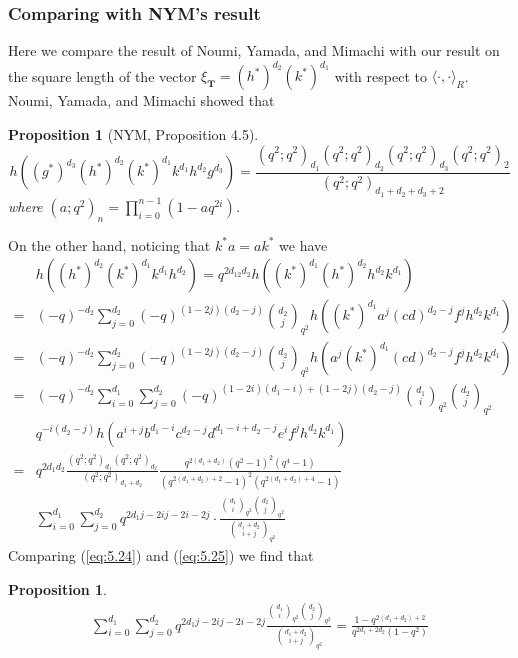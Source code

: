 \documentclass[table,a4paper,reqno]{amsart}
\numberwithin{equation}{section}
\newtheorem{proposition}[theorem]{Proposition}
\theoremstyle{definition}
\begin{document}
\subsubsection{Comparing with NYM's result}
Here we compare the result of Noumi, Yamada, and Mimachi with our result on the square length of the vector $\xi_\textbf{T}=(h^*)^{d_2}(k^*)^{d_1}$ with respect to $\langle\cdot,\cdot\rangle_R$. Noumi, Yamada, and Mimachi showed that
\begin{proposition}[NYM, Proposition 4.5]
    \begin{equation}\label{eq:5.24}
        h((g^*)^{d_3}(h^*)^{d_2}(k^*)^{d_1}k^{d_1}h^{d_2}g^{d_3})=\frac{(q^{2};q^{2})_{d_1}(q^{2};q^{2})_{d_2}(q^{2};q^{2})_{d_3}(q^{2};q^{2})_{2}}{(q^{2};q^{2})_{d_1+d_2+d_3+2}}
    \end{equation}
    where $(a;q^2)_n=\prod_{i=0}^{n-1}(1-aq^{2i})$.
\end{proposition}
\noindent On the other hand, noticing that $k^*a=ak^*$ we have
\begin{equation}\label{eq:5.25}
    \begin{split}
        &h((h^*)^{d_2}(k^*)^{d_1}k^{d_1}h^{d_2})=q^{2d_12d_2}h((k^*)^{d_1}(h^*)^{d_2}h^{d_2}k^{d_1})\\
        =&(-q)^{-d_2}\sum_{j=0}^{d_2}(-q)^{(1-2j)(d_2-j)}{d_2\choose j}_{q^2}h((k^*)^{d_1}a^j(cd)^{d_2-j}f^jh^{d_2}k^{d_1})\\
        =&(-q)^{-d_2}\sum_{j=0}^{d_2}(-q)^{(1-2j)(d_2-j)}{d_2\choose j}_{q^2}h(a^j(k^*)^{d_1}(cd)^{d_2-j}f^jh^{d_2}k^{d_1})\\
        =&(-q)^{-d_2}\sum_{i=0}^{d_1}\sum_{j=0}^{d_2}(-q)^{(1-2i)(d_1-i)+(1-2j)(d_2-j)}{d_1\choose i}_{q^2}{d_2\choose j}_{q^2}\\
        &q^{-i(d_2-j)}h(a^{i+j}b^{d_1-i}c^{d_2-j}d^{d_1-i+d_2-j}e^if^jh^{d_2}k^{d_1})\\
        =&q^{2d_1d_2}\frac{(q^2;q^2)_{d_1}(q^2;q^2)_{d_2}}{(q^2;q^2)_{d_1+d_2}}\frac{q^{2(d_1+d_2)}(q^2-1)^2(q^4-1)}{(q^{2(d_1+d_2)+2}-1)^2(q^{2(d_1+d_2)+4}-1)}\\
        &\sum_{i=0}^{d_1}\sum_{j=0}^{d_2}q^{2d_1j-2ij-2i-2j}\cdot \frac{{d_1\choose i}_{q^2}{d_2\choose j}_{q^2}}{{d_1+d_2\choose i+j}_{q^2}}
    \end{split}
\end{equation}
Comparing (\ref{eq:5.24}) and (\ref{eq:5.25}) we find that
\begin{proposition}
    \begin{equation}\label{eq:5.26}
        \begin{split}
        \sum_{i=0}^{d_1}\sum_{j=0}^{d_2}q^{2d_1j-2ij-2i-2j}\frac{{d_1\choose i}_{q^2}{d_2\choose j}_{q^2}}{{d_1+d_2\choose i+j}_{q^2}}=\frac{1-q^{2(d_1+d_2)+2}}{q^{2d_1+2d_2}(1-q^2)}
        \end{split}
    \end{equation}
\end{proposition}
\end{document}
